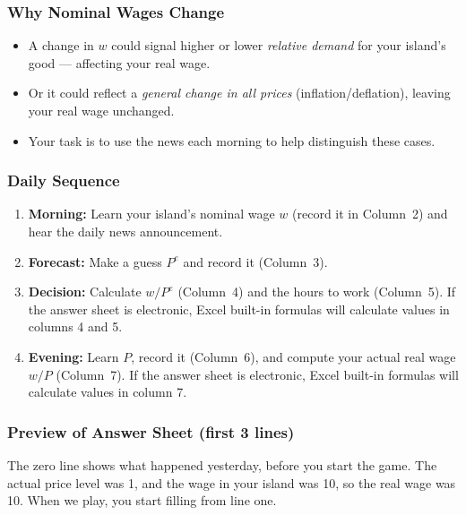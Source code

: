 \documentclass[a4paper,11pt]{article}%
\begin{document}
\begin{mdframed}[linewidth=1pt,roundcorner=5pt,backgroundcolor=gray!5]
\subsubsection*{Why Nominal Wages Change}
\begin{itemize}
  \item A change in $w$ could signal higher or lower \emph{relative demand} for your island’s good — affecting your real wage.
  \item Or it could reflect a \emph{general change in all prices} (inflation/deflation), leaving your real wage unchanged.
  \item Your task is to use the news each morning to help distinguish these cases.
\end{itemize}

\subsubsection*{Daily Sequence}
\begin{enumerate}
  \item \textbf{Morning:} Learn your island's nominal wage $w$ (record it in Column~2) and hear the daily news announcement.
  \item \textbf{Forecast:} Make a guess $P^e$ and record it (Column~3).
  \item \textbf{Decision:} Calculate $w/P^e$ (Column~4) and the hours to work (Column~5). If the answer sheet is electronic, Excel built-in formulas will calculate values in columns 4 and 5.
  \item \textbf{Evening:} Learn $P$, record it (Column~6), and compute your actual real wage $w/P$ (Column~7). If the answer sheet is electronic, Excel built-in formulas will calculate values in column 7.
\end{enumerate}

\subsubsection*{Preview of Answer Sheet (first 3 lines)}
The zero line shows what happened yesterday, before you start the game. The actual price level was 1, and the wage in your island was 10, so the real wage was 10. When we play, you start filling from line one.


\end{mdframed}
\end{document}
